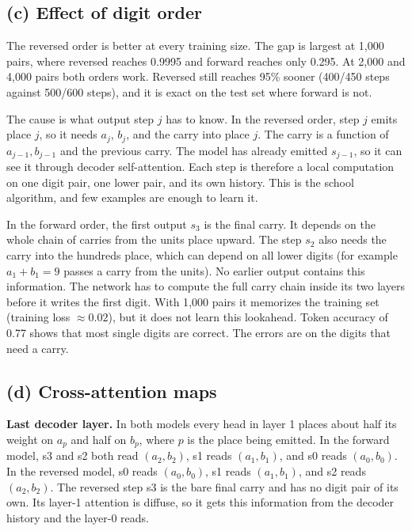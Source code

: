 \documentclass[11pt]{article}
\begin{document}
\subsection*{(c) Effect of digit order}

The reversed order is better at every training size. The gap is largest
at 1{,}000 pairs, where reversed reaches 0.9995 and forward reaches only 0.295. At 2{,}000 and
4{,}000 pairs both orders work. Reversed still reaches 95\% sooner (400/450
steps against 500/600 steps), and it is exact on the test set where forward is not.

The cause is what output step $j$ has to know. In the reversed order, step $j$
emits place $j$, so it needs $a_j$, $b_j$, and the carry into place $j$.
The carry is a function of $a_{j-1}, b_{j-1}$ and the previous carry. The
model has already emitted $s_{j-1}$, so it can see it through decoder self-attention.
Each step is therefore a local computation on one digit pair, one lower pair, and its own
history. This is the school algorithm, and few examples are enough to learn it.

In the forward order, the first output $s_3$ is the final carry. It depends
on the whole chain of carries from the units place upward. The step $s_2$ also needs the
carry into the hundreds place, which can depend on all lower digits (for example
$a_1+b_1=9$ passes a carry from the units). No earlier output contains this
information. The network has to compute the full carry chain
inside its two layers before it writes the first digit. With 1{,}000 pairs it
memorizes the training set (training loss $\approx 0.02$), but it does not learn this
lookahead. Token accuracy of 0.77 shows that most single digits are correct. The errors are on
the digits that need a carry.

\subsection*{(d) Cross-attention maps}

\textbf{Last decoder layer.} In both models every head in layer 1 places
about half its weight on $a_p$ and half on $b_p$, where $p$ is the place being emitted.
In the forward model, s3 and s2 both read $(a_2,b_2)$, s1 reads $(a_1,b_1)$, and s0
reads $(a_0,b_0)$. In the reversed model, s0 reads $(a_0,b_0)$, s1 reads $(a_1,b_1)$, and s2 reads
$(a_2,b_2)$. The reversed step s3 is the bare final carry and has no digit pair of its own.
Its layer-1 attention is diffuse, so it gets this information from the decoder history
and the layer-0 reads.
\end{document}
